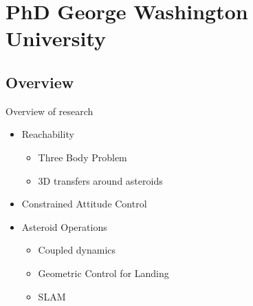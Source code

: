 
\section[PhD Research]{PhD George Washington University}

\subsection[Overview]{Overview}

\begin{frame}{Overview of research}
    \begin{itemize}
        \item Reachability
            \begin{itemize}
                \item Three Body Problem
                \item 3D transfers around asteroids
            \end{itemize}
        \item Constrained Attitude Control
        \item Asteroid Operations
            \begin{itemize}
                \item Coupled dynamics
                \item Geometric Control for Landing
                \item SLAM
            \end{itemize}
    \end{itemize}
\end{frame}

